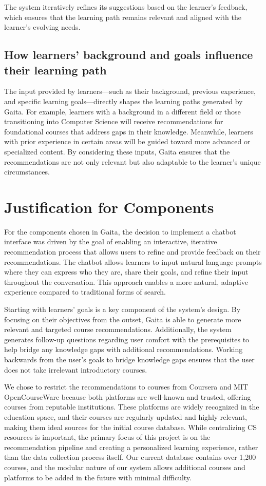 The system iteratively refines its suggestions based on the learner's feedback, which ensures that the learning path remains relevant and aligned with the learner's evolving needs.

\subsection{How learners' background and goals influence their learning path}

The input provided by learners—such as their background, previous experience, and specific learning goals—directly shapes the learning paths generated by Gaita. For example, learners with a background in a different field or those transitioning into Computer Science will receive recommendations for foundational courses that address gaps in their knowledge. Meanwhile, learners with prior experience in certain areas will be guided toward more advanced or specialized content. By considering these inputs, Gaita ensures that the recommendations are not only relevant but also adaptable to the learner's unique circumstances.

\section{Justification for Components} 
For the components chosen in Gaita, the decision to implement a chatbot interface was driven by the goal of enabling an interactive, iterative recommendation process that allows users to refine and provide feedback on their recommendations. The chatbot allows learners to input natural language prompts where they can express who they are, share their goals, and refine their input throughout the conversation. This approach enables a more natural, adaptive experience compared to traditional forms of search. 

Starting with learners' goals is a key component of the system's design. By focusing on their objectives from the outset, Gaita is able to generate more relevant and targeted course recommendations. Additionally, the system generates follow-up questions regarding user comfort with the prerequisites to help bridge any knowledge gaps with additional recommendations. Working backwards from the user’s goals to bridge knowledge gaps ensures that the user does not take irrelevant introductory courses. 

We chose to restrict the recommendations to courses from Coursera and MIT OpenCourseWare because both platforms are well-known and trusted, offering courses from reputable institutions. These platforms are widely recognized in the education space, and their courses are regularly updated and highly relevant, making them ideal sources for the initial course database. While centralizing CS resources is important, the primary focus of this project is on the recommendation pipeline and creating a personalized learning experience, rather than the data collection process itself. Our current database contains over 1,200 courses, and the modular nature of our system allows additional courses and platforms to be added in the future with minimal difficulty. 

